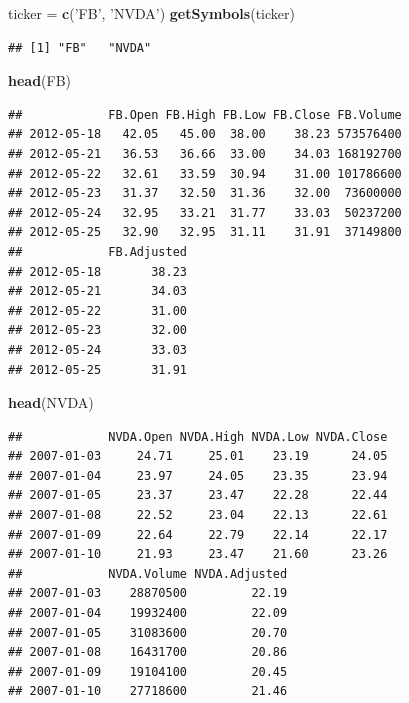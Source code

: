 \documentclass[12pt,]{book}
\newenvironment{Shaded}{\begin{snugshade}}{\end{snugshade}}
\newcommand{\KeywordTok}[1]{\textcolor[rgb]{0.13,0.29,0.53}{\textbf{#1}}}
\newcommand{\NormalTok}[1]{#1}
\newcommand{\StringTok}[1]{\textcolor[rgb]{0.31,0.60,0.02}{#1}}
\begin{document}
\begin{Shaded}
\begin{Highlighting}[]
\NormalTok{ticker =}\StringTok{ }\KeywordTok{c}\NormalTok{(}\StringTok{'FB'}\NormalTok{, }\StringTok{'NVDA'}\NormalTok{) }
\KeywordTok{getSymbols}\NormalTok{(ticker)}
\end{Highlighting}
\end{Shaded}

\begin{verbatim}
## [1] "FB"   "NVDA"
\end{verbatim}

\begin{Shaded}
\begin{Highlighting}[]
\KeywordTok{head}\NormalTok{(FB)}
\end{Highlighting}
\end{Shaded}

\begin{verbatim}
##            FB.Open FB.High FB.Low FB.Close FB.Volume
## 2012-05-18   42.05   45.00  38.00    38.23 573576400
## 2012-05-21   36.53   36.66  33.00    34.03 168192700
## 2012-05-22   32.61   33.59  30.94    31.00 101786600
## 2012-05-23   31.37   32.50  31.36    32.00  73600000
## 2012-05-24   32.95   33.21  31.77    33.03  50237200
## 2012-05-25   32.90   32.95  31.11    31.91  37149800
##            FB.Adjusted
## 2012-05-18       38.23
## 2012-05-21       34.03
## 2012-05-22       31.00
## 2012-05-23       32.00
## 2012-05-24       33.03
## 2012-05-25       31.91
\end{verbatim}

\begin{Shaded}
\begin{Highlighting}[]
\KeywordTok{head}\NormalTok{(NVDA)}
\end{Highlighting}
\end{Shaded}

\begin{verbatim}
##            NVDA.Open NVDA.High NVDA.Low NVDA.Close
## 2007-01-03     24.71     25.01    23.19      24.05
## 2007-01-04     23.97     24.05    23.35      23.94
## 2007-01-05     23.37     23.47    22.28      22.44
## 2007-01-08     22.52     23.04    22.13      22.61
## 2007-01-09     22.64     22.79    22.14      22.17
## 2007-01-10     21.93     23.47    21.60      23.26
##            NVDA.Volume NVDA.Adjusted
## 2007-01-03    28870500         22.19
## 2007-01-04    19932400         22.09
## 2007-01-05    31083600         20.70
## 2007-01-08    16431700         20.86
## 2007-01-09    19104100         20.45
## 2007-01-10    27718600         21.46
\end{verbatim}
\end{document}

